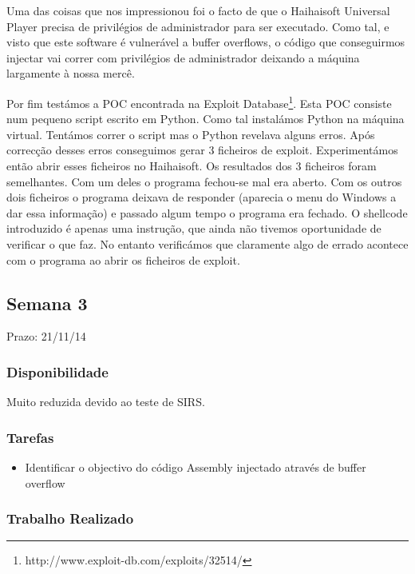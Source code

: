 \documentclass[a4paper]{article}
\begin{document}
Uma das coisas que nos impressionou foi o facto de que o Haihaisoft Universal Player precisa de privilégios de administrador para ser executado. Como tal, e visto que este software é vulnerável a buffer overflows, o código que conseguirmos injectar vai correr com privilégios de administrador deixando a máquina largamente à nossa mercê.

Por fim testámos a POC encontrada na Exploit Database\footnote{http://www.exploit-db.com/exploits/32514/}. Esta POC consiste num pequeno script escrito em Python. Como tal instalámos Python na máquina virtual. Tentámos correr o script mas o Python revelava alguns erros. Após correcção desses erros conseguimos gerar 3 ficheiros de exploit. Experimentámos então abrir esses ficheiros no Haihaisoft. Os resultados dos 3 ficheiros foram semelhantes. Com um deles o programa fechou-se mal era aberto. Com os outros dois ficheiros o programa deixava de responder (aparecia o menu do Windows a dar essa informação) e passado algum tempo o programa era fechado. O shellcode introduzido é apenas uma instrução, que ainda não tivemos oportunidade de verificar o que faz. No entanto verificámos que claramente algo de errado acontece com o programa ao abrir os ficheiros de exploit.

\subsection{Semana 3}
Prazo: 21/11/14
\subsubsection{Disponibilidade}
Muito reduzida devido ao teste de SIRS.

\subsubsection{Tarefas}
\begin{itemize}
	\item Identificar o objectivo do código Assembly injectado através de buffer overflow
\end{itemize}

\subsubsection{Trabalho Realizado}
\end{document}
